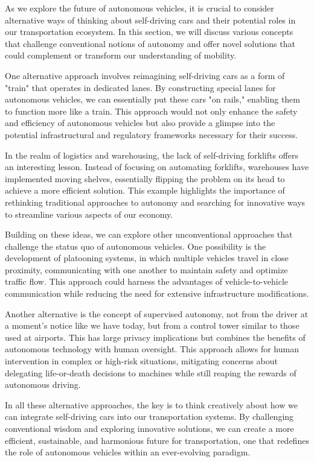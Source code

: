 As we explore the future of autonomous vehicles, it is crucial to consider alternative ways of thinking about self-driving cars and their potential roles in our transportation ecosystem. In this section, we will discuss various concepts that challenge conventional notions of autonomy and offer novel solutions that could complement or transform our understanding of mobility.

One alternative approach involves reimagining self-driving cars as a form of "train" that operates in dedicated lanes. By constructing special lanes for autonomous vehicles, we can essentially put these cars "on rails," enabling them to function more like a train. This approach would not only enhance the safety and efficiency of autonomous vehicles but also provide a glimpse into the potential infrastructural and regulatory frameworks necessary for their success.

In the realm of logistics and warehousing, the lack of self-driving forklifts offers an interesting lesson. Instead of focusing on automating forklifts, warehouses have implemented moving shelves, essentially flipping the problem on its head to achieve a more efficient solution. This example highlights the importance of rethinking traditional approaches to autonomy and searching for innovative ways to streamline various aspects of our economy.

Building on these ideas, we can explore other unconventional approaches that challenge the status quo of autonomous vehicles. One possibility is the development of platooning systems, in which multiple vehicles travel in close proximity, communicating with one another to maintain safety and optimize traffic flow. This approach could harness the advantages of vehicle-to-vehicle communication while reducing the need for extensive infrastructure modifications.

Another alternative is the concept of supervised autonomy, not from the driver at a moment's notice like we have today, but from a control tower similar to those used at airports. This has large privacy implications but combines the benefits of autonomous technology with human oversight. This approach allows for human intervention in complex or high-risk situations, mitigating concerns about delegating life-or-death decisions to machines while still reaping the rewards of autonomous driving.

In all these alternative approaches, the key is to think creatively about how we can integrate self-driving cars into our transportation systems. By challenging conventional wisdom and exploring innovative solutions, we can create a more efficient, sustainable, and harmonious future for transportation, one that redefines the role of autonomous vehicles within an ever-evolving paradigm.

